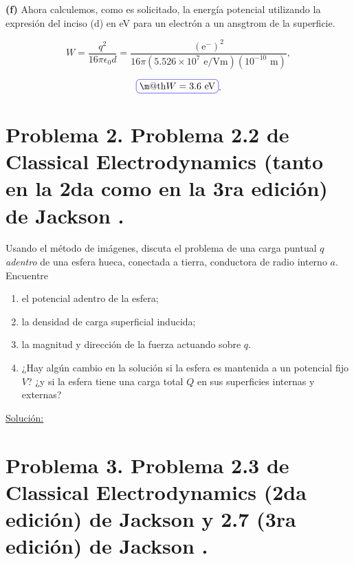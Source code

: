 \documentclass[a4paper,10pt]{article}
\makeatletter
\numberwithin{equation}{section}
\newcommand*{\boxcolor}{blue}
\renewcommand{\boxed}[1]{\textcolor{\boxcolor}{%
\tikz[baseline={([yshift=-1ex]current bounding box.center)}] \node [rectangle, minimum width=1ex,rounded corners,draw] {\normalcolor\m@th$\displaystyle#1$};}}
\makeatother
\begin{document}
\textbf{(f)} Ahora calculemos, como es solicitado, la energía potencial utilizando 
la expresión del inciso (d) en eV para un electrón a un ansgtrom de la superficie.

\begin{equation}
 W = \frac{q^2}{16\pi\epsilon_0d} = \frac{(\text{e}^-)^2}{16\pi(5.526\times 10^7 \text{ e/Vm})
 (10^{-10}\text{ m})},
\end{equation}

\begin{equation}
 \boxed{W = 3.6 \text{ eV}}.
\end{equation}












\section{Problema 2. Problema 2.2 de Classical Electrodynamics (tanto en la 2da 
como en la 3ra edición) de Jackson \cite{jackson2,jackson3}.}

Usando el método de imágenes, discuta el problema de una carga puntual $q$ 
\emph{adentro} de una esfera hueca, conectada a tierra, conductora de radio interno
$a$. Encuentre 

\begin{enumerate}[label=\textbf{(\alph*)}]
 \item el potencial adentro de la esfera;
 \item la densidad de carga superficial inducida;
 \item la magnitud y dirección de la fuerza actuando sobre $q$.
 \item ¿Hay algún cambio en la solución si la esfera es mantenida a un potencial 
 fijo $V$? ¿y si la esfera tiene una carga total $Q$ en sus superficies internas y 
 externas?
\end{enumerate}

\vspace{.3cm}

\underline{Solución:} \vspace{.3cm}

\section{Problema 3. Problema 2.3 de Classical Electrodynamics (2da edición) de Jackson 
\cite{jackson2} y 2.7 (3ra edición) de Jackson \cite{jackson3}.}
\end{document}
